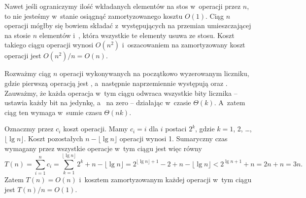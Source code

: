 
\exercise %
Nawet jeśli ograniczymy ilość wkładanych elementów na stos w~operacji  przez $n$, to nie jesteśmy w~stanie osiągnąć zamortyzowanego kosztu $O(1)$.
Ciąg $n$ operacji mógłby się bowiem składać z~występujących na przemian  umieszczającej na stosie $n$ elementów i~, która wszystkie te elementy usuwa ze stosu.
Koszt takiego ciągu operacji wynosi $O(n^2)$ i~oszacowaniem na zamortyzowany koszt operacji jest $O(n^2)/n=O(n)$.

\exercise %
Rozważmy ciąg $n$ operacji wykonywanych na początkowo wyzerowanym liczniku, gdzie pierwszą operacją jest , a~następnie naprzemiennie występują  oraz .
Zauważmy, że każda operacja w~tym ciągu odwraca wszystkie bity licznika --  ustawia każdy bit na jedynkę, a~ na zero -- działając w~czasie $\Theta(k)$.
A~zatem ciąg ten wymaga w~sumie czasu $\Theta(nk)$.

\exercise %
Oznaczmy przez $c_i$ koszt  operacji.
Mamy $c_i=i$ dla $i$ postaci $2^k$, gdzie $k=1$, 2, \dots, $\lfloor\lg n\rfloor$.
Koszt pozostałych $n-\lfloor\lg n\rfloor$ operacji wynosi 1.
Sumaryczny czas wymagany przez wszystkie operacje w~tym ciągu jest więc równy
\[
	T(n) = \sum_{i=1}^nc_i = \sum_{k=1}^{\lfloor\lg n\rfloor}2^k+n-\lfloor\lg n\rfloor = 2^{\lfloor\lg n\rfloor+1}-2+n-\lfloor\lg n\rfloor < 2^{\lg n+1}+n = 2n+n = 3n.
\]
Zatem $T(n)=O(n)$ i~kosztem zamortyzowanym każdej operacji w~tym ciągu jest $T(n)/n=O(1)$.
